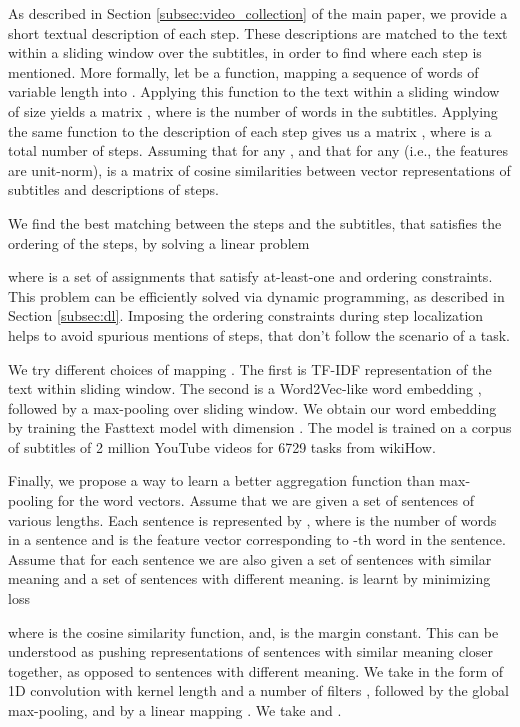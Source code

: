 \documentclass[10pt,twocolumn,letterpaper]{article}
\begin{document}
As described in Section \ref{subsec:video_collection} of the main paper, we provide a short textual description of each step.
These descriptions are matched to the text within a sliding window over the subtitles, in order to find where each step is mentioned.
More formally, let  be a function, mapping a sequence of words of variable length into .
Applying this function to the text within a sliding window of size  yields a matrix , where  is the number of words in the subtitles.
Applying the same function to the description of each step gives us a matrix , where  is a total number of steps.
Assuming that  for any , and that  for any 
(i.e., the features are unit-norm),  is a matrix of cosine similarities between vector representations of subtitles and descriptions of steps.

We find the best matching  between the steps and the subtitles, that satisfies the ordering of the steps, by solving a linear problem

where  is a set of assignments that satisfy at-least-one and ordering constraints.
This problem can be efficiently solved via dynamic programming, as described in Section \ref{subsec:dl}.
Imposing the ordering constraints during step localization helps to avoid spurious mentions of steps, that don't follow the scenario of a task.

We try different choices of mapping .
The first is TF-IDF representation of the text within sliding window.
The second is a Word2Vec-like word embedding , followed by a max-pooling over sliding window.
We obtain our word embedding by training the Fasttext model  with dimension .
The model is trained on a corpus of subtitles of 2 million YouTube videos for 6729 tasks from wikiHow.

Finally, we propose a way to learn a better aggregation function than max-pooling for the word vectors.
Assume that we are given a set of sentences  of various lengths.
Each sentence  is represented by , where  is the number of words in a sentence and  is the feature vector corresponding to -th word in the sentence.
Assume that for each sentence  we are also given a set of sentences  with similar meaning and a set of sentences  with different meaning.
 is learnt by minimizing loss

where  is the cosine similarity function, and,  is the margin constant.
This can be understood as pushing representations of sentences with similar meaning closer together, as opposed to sentences with different meaning.
We take  in the form of 1D convolution with kernel length  and a number of filters , followed by the global max-pooling, and by a linear mapping . We take  and .
\end{document}
